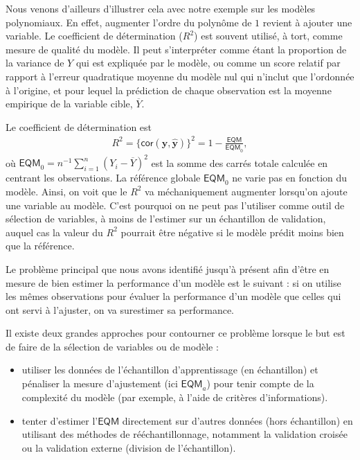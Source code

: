 \documentclass[
  11pt,
  letterpaper,
]{scrbook}
\providecommand{\tightlist}{%
  \setlength{\itemsep}{0pt}\setlength{\parskip}{0pt}}\usepackage{longtable,booktabs,array}
\theoremstyle{definition}
\theoremstyle{remark}
\begin{document}
Nous venons d'ailleurs d'illustrer cela avec notre exemple sur les
modèles polynomiaux. En effet, augmenter l'ordre du polynôme de \(1\)
revient à ajouter une variable. Le coefficient de détermination
(\(R^2\)) est souvent utilisé, à tort, comme mesure de qualité du
modèle. Il peut s'interpréter comme étant la proportion de la variance
de \(Y\) qui est expliquée par le modèle, ou comme un score relatif par
rapport à l'erreur quadratique moyenne du modèle nul qui n'inclut que
l'ordonnée à l'origine, et pour lequel la prédiction de chaque
observation est la moyenne empirique de la variable cible,
\(\overline{Y}\).

Le coefficient de détermination est \begin{align*}
R^2=\{\mathsf{cor}(\boldsymbol{y}, \widehat{\boldsymbol{y}})\}^2 = 1-\frac{\mathsf{EQM}}{\mathsf{EQM}_0},
\end{align*} où
\(\mathsf{EQM}_0=n^{-1}\sum_{i=1}^n (Y_i-\overline{Y})^2\) est la somme
des carrés totale calculée en centrant les observations. La référence
globale \(\mathsf{EQM}_0\) ne varie pas en fonction du modèle. Ainsi, on
voit que le \(R^2\) va méchaniquement augmenter lorsqu'on ajoute une
variable au modèle. C'est pourquoi on ne peut pas l'utiliser comme outil
de sélection de variables, à moins de l'estimer sur un échantillon de
validation, auquel cas la valeur du \(R^2\) pourrait être négative si le
modèle prédit moins bien que la référence.

Le problème principal que nous avons identifié jusqu'à présent afin
d'être en mesure de bien estimer la performance d'un modèle est le
suivant : si on utilise les mêmes observations pour évaluer la
performance d'un modèle que celles qui ont servi à l'ajuster, on va
surestimer sa performance.

Il existe deux grandes approches pour contourner ce problème lorsque le
but est de faire de la sélection de variables ou de modèle :

\begin{itemize}
\tightlist
\item
  utiliser les données de l'échantillon d'apprentissage (en échantillon)
  et pénaliser la mesure d'ajustement (ici \(\widehat{\mathsf{EQM}}_a\))
  pour tenir compte de la complexité du modèle (par exemple, à l'aide de
  critères d'informations).
\item
  tenter d'estimer l'\(\mathsf{EQM}\) directement sur d'autres données
  (hors échantillon) en utilisant des méthodes de rééchantillonnage,
  notamment la validation croisée ou la validation externe (division de
  l'échantillon).
\end{itemize}
\end{document}
